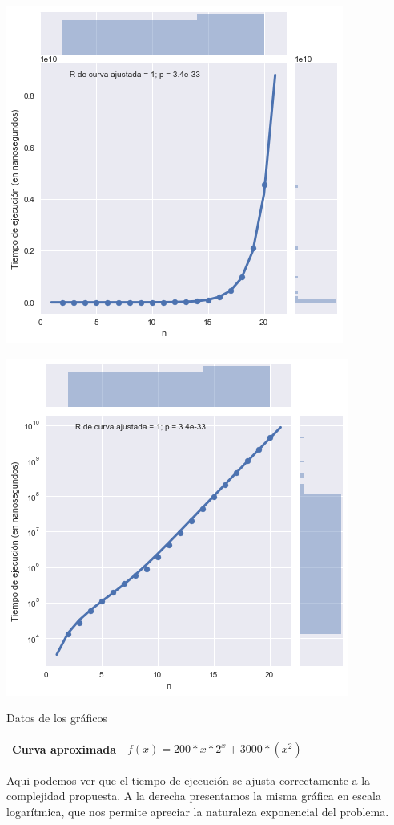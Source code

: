 \noindent
\begin{minipage}{0.49\textwidth}
	\hfill
	\includegraphics[scale=0.55]{img/exact-2n.png}
\end{minipage}
\hfill
\begin{minipage}{0.49\textwidth}
	\hfill
	\includegraphics[scale=0.55]{img/exact-2n-log.png}
\end{minipage}

\begin{center}
	Datos de los gráficos

	\begin{tabular}{ | l l |}
		\hline
		Curva aproximada & $f(x) = 200 * x * 2^x + 3000 * (x^2)$ \\
		\hline
	\end{tabular}
\end{center}

Aqui podemos ver que el tiempo de ejecución se ajusta correctamente a la complejidad propuesta. A la derecha presentamos la misma gráfica en escala logarítmica, que nos permite apreciar la naturaleza exponencial del problema.
